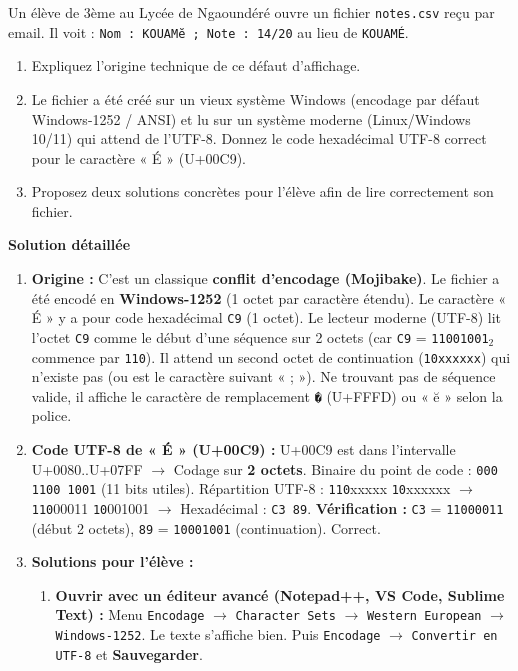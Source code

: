 \documentclass[11pt]{article}
\begin{document}
\begin{exoresolu}
    Un élève de 3ème au Lycée de Ngaoundéré ouvre un fichier \texttt{notes.csv} reçu par email. Il voit : \texttt{Nom : KOUAM\u{e} ; Note : 14/20} au lieu de \texttt{KOUAMÉ}.
    \begin{enumerate}
        \item Expliquez l'origine technique de ce défaut d'affichage.
        \item Le fichier a été créé sur un vieux système Windows (encodage par défaut Windows-1252 / ANSI) et lu sur un système moderne (Linux/Windows 10/11) qui attend de l'UTF-8. Donnez le code hexadécimal UTF-8 correct pour le caractère « É » (U+00C9).
        \item Proposez deux solutions concrètes pour l'élève afin de lire correctement son fichier.
    \end{enumerate}
    \tcblower
    \textbf{Solution détaillée}
    \begin{enumerate}
        \item \textbf{Origine :} C'est un classique \textbf{conflit d'encodage (Mojibake)}. Le fichier a été encodé en \textbf{Windows-1252} (1 octet par caractère étendu). Le caractère « É » y a pour code hexadécimal \texttt{C9} (1 octet). Le lecteur moderne (UTF-8) lit l'octet \texttt{C9} comme le début d'une séquence sur 2 octets (car \texttt{C9} = \texttt{11001001}$_2$ commence par \texttt{110}). Il attend un second octet de continuation (\texttt{10xxxxxx}) qui n'existe pas (ou est le caractère suivant « ; »). Ne trouvant pas de séquence valide, il affiche le caractère de remplacement \texttt{�} (U+FFFD) ou « \u{e} » selon la police.
        \item \textbf{Code UTF-8 de « É » (U+00C9) :}
        U+00C9 est dans l'intervalle U+0080..U+07FF $\to$ Codage sur \textbf{2 octets}.
        Binaire du point de code : \texttt{000 1100 1001} (11 bits utiles).
        Répartition UTF-8 : \texttt{110}xxxxx \texttt{10}xxxxxx
        $\to$ \texttt{110}00011 \texttt{10}001001
        $\to$ Hexadécimal : \texttt{C3 89}.
        \textbf{Vérification :} \texttt{C3} = \texttt{11000011} (début 2 octets), \texttt{89} = \texttt{10001001} (continuation). Correct.
        \item \textbf{Solutions pour l'élève :}
        \begin{enumerate}
            \item \textbf{Ouvrir avec un éditeur avancé (Notepad++, VS Code, Sublime Text) :} Menu \texttt{Encodage} $\to$ \texttt{Character Sets} $\to$ \texttt{Western European} $\to$ \texttt{Windows-1252}. Le texte s'affiche bien. Puis \texttt{Encodage} $\to$ \texttt{Convertir en UTF-8} et \textbf{Sauvegarder}.

\end{enumerate}
\end{enumerate}
\end{exoresolu}
\end{document}
